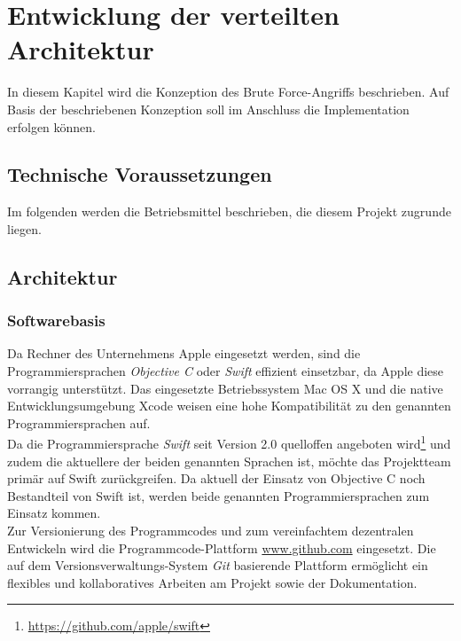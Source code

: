 \chapter{Entwicklung der verteilten Architektur}
\label{vorueberlegungen}
In diesem Kapitel wird die Konzeption des Brute Force-Angriffs beschrieben. Auf Basis der beschriebenen Konzeption soll im Anschluss die Implementation erfolgen können. 


\section{Technische Voraussetzungen}
\label{Voraussetzungen}
Im folgenden werden die Betriebsmittel beschrieben, die diesem Projekt zugrunde liegen.

\section{Architektur}

\subsection{Softwarebasis}
Da Rechner des Unternehmens Apple eingesetzt werden, sind die Programmiersprachen \emph{Objective C} oder \emph{Swift} effizient einsetzbar, da Apple diese vorrangig unterstützt. Das eingesetzte Betriebssystem Mac OS X %
und die native Entwicklungsumgebung Xcode%
weisen eine hohe Kompatibilität zu den genannten Programmiersprachen auf. \\
Da die Programmiersprache \emph{Swift} seit Version 2.0 quelloffen angeboten wird\footnote{\url{https://github.com/apple/swift}} und zudem die aktuellere der beiden genannten Sprachen ist, möchte das Projektteam primär auf Swift zurückgreifen. Da aktuell der Einsatz von Objective C noch Bestandteil von Swift ist, werden beide genannten Programmiersprachen zum Einsatz kommen. \\

Zur Versionierung des Programmcodes und zum vereinfachtem dezentralen Entwickeln wird die Programmcode-Plattform \url{www.github.com} eingesetzt. Die auf dem Versionsverwaltungs-System \emph{Git} basierende Plattform ermöglicht ein flexibles und kollaboratives Arbeiten am Projekt sowie der Dokumentation. \\

